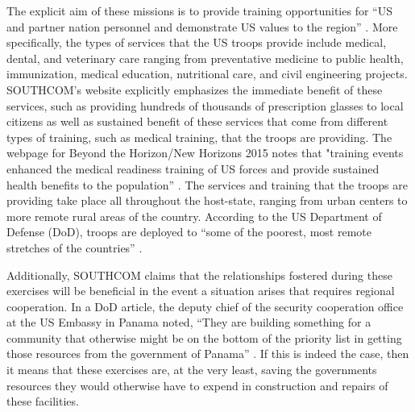 \documentclass[12pt]{article}
\begin{document}
\begin{doublespace}
The explicit aim of these missions is to provide training opportunities for ``US and partner nation personnel and demonstrate US values to the region'' \cite{SouthcomStatePartner}. More specifically, the types of services that the US troops provide include medical, dental, and veterinary care ranging from preventative medicine to public health, immunization, medical education, nutritional care, and civil engineering projects. SOUTHCOM's website explicitly emphasizes the immediate benefit of these services, such as providing hundreds of thousands of prescription glasses to local citizens as well as sustained benefit of these services that come from different types of training, such as medical training, that the troops are providing. The webpage for Beyond the Horizon/New Horizons 2015 notes that "training events enhanced the medical readiness training of US forces and provide sustained health benefits to the population'' \cite{southcom2015}. The services and training that the troops are providing take place all throughout the host-state, ranging from urban centers to more remote rural areas of the country. According to the US Department of Defense (DoD), troops are deployed to ``some of the poorest, most remote stretches of the countries'' \cite{Miles2013}.




 

Additionally, SOUTHCOM claims that the relationships fostered during these exercises will be beneficial in the event a situation arises that requires regional cooperation. In a DoD article, the deputy chief of the security cooperation office at the US Embassy in Panama noted, ``They are building something for a community that otherwise might be on the bottom of the priority list in getting those resources from the government of Panama'' \cite{Miles2013}. If this is indeed the case, then it means that these exercises are, at the very least, saving the governments resources they would otherwise have to expend in construction and repairs of these facilities. 


\end{doublespace}
\end{document}

